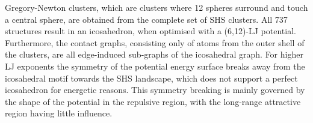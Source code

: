 Gregory-Newton clusters, which are clusters where 12 spheres surround and touch
a central sphere, are obtained from the complete set of SHS clusters. All 737
structures result in an icosahedron, when optimised with a (6,12)-LJ potential.
Furthermore, the contact graphs, consisting only of atoms from the outer shell
of the clusters, are all edge-induced sub-graphs of the icosahedral graph. For higher
LJ exponents the symmetry of the potential energy surface breaks away from the
icosahedral motif towards the SHS landscape, which does not support a perfect
icosahedron for energetic reasons. This symmetry breaking is
mainly governed by the shape of the potential in the repulsive region, with the
long-range attractive region having little influence.




